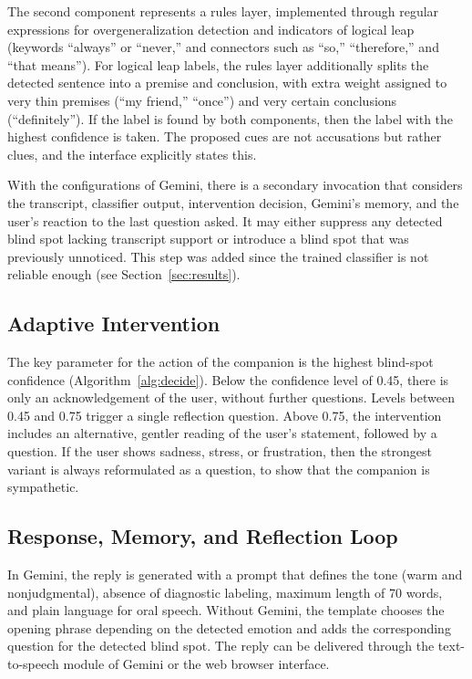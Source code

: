 \documentclass[conference]{IEEEtran}
\begin{document}
The second component represents a rules layer, implemented through regular expressions for overgeneralization detection and indicators of logical leap (keywords ``always'' or ``never,'' and connectors such as ``so,'' ``therefore,'' and ``that means''). For logical leap labels, the rules layer additionally splits the detected sentence into a premise and conclusion, with extra weight assigned to very thin premises (``my friend,'' ``once'') and very certain conclusions (``definitely''). If the label is found by both components, then the label with the highest confidence is taken. The proposed cues are not accusations but rather clues, and the interface explicitly states this.

With the configurations of Gemini, there is a secondary invocation that considers the transcript, classifier output, intervention decision, Gemini's memory, and the user's reaction to the last question asked. It may either suppress any detected blind spot lacking transcript support or introduce a blind spot that was previously unnoticed. This step was added since the trained classifier is not reliable enough (see Section~\ref{sec:results}).

\subsection{Adaptive Intervention}
The key parameter for the action of the companion is the highest blind-spot confidence (Algorithm~\ref{alg:decide}). Below the confidence level of 0.45, there is only an acknowledgement of the user, without further questions. Levels between 0.45 and 0.75 trigger a single reflection question. Above 0.75, the intervention includes an alternative, gentler reading of the user's statement, followed by a question. If the user shows sadness, stress, or frustration, then the strongest variant is always reformulated as a question, to show that the companion is sympathetic.

\subsection{Response, Memory, and Reflection Loop}
In Gemini, the reply is generated with a prompt that defines the tone (warm and nonjudgmental), absence of diagnostic labeling, maximum length of 70 words, and plain language for oral speech. Without Gemini, the template chooses the opening phrase depending on the detected emotion and adds the corresponding question for the detected blind spot. The reply can be delivered through the text-to-speech module of Gemini or the web browser interface.
\end{document}
